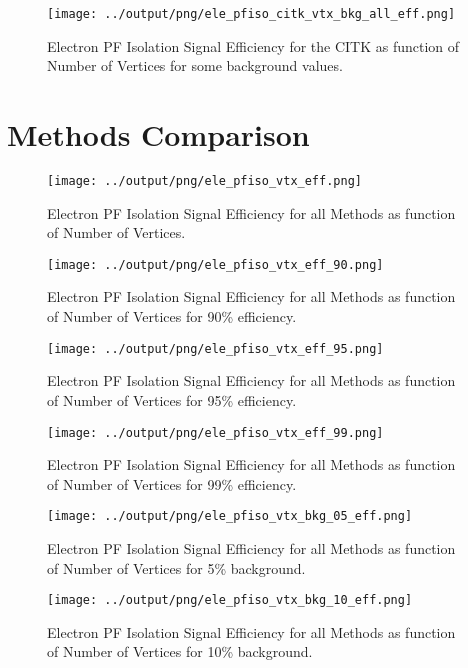\documentclass[11pt]{book}
\begin{document}
\begin{figure}[htb]
\centering
\texttt{[image: ../output/png/ele\_pfiso\_citk\_vtx\_bkg\_all\_eff.png]}
\caption{Electron PF Isolation Signal Efficiency for the CITK as function of Number of Vertices for some background values.}
\label{fig:ele_pfiso_vtx_eff_citk_bkg_all_eff}
\end{figure}
\clearpage

\section{Methods Comparison}
\begin{figure}[htb]
\centering
\texttt{[image: ../output/png/ele\_pfiso\_vtx\_eff.png]}
\caption{Electron PF Isolation Signal Efficiency for all Methods as function of Number of Vertices.}
\label{fig:ele_pfiso_vtx_eff}
\end{figure}

\begin{figure}[htb]
\centering
\texttt{[image: ../output/png/ele\_pfiso\_vtx\_eff\_90.png]}
\caption{Electron PF Isolation Signal Efficiency for all Methods as function of Number of Vertices for 90\% efficiency.}
\label{fig:ele_pfiso_vtx_eff_90}
\end{figure}

\begin{figure}[htb]
\centering
\texttt{[image: ../output/png/ele\_pfiso\_vtx\_eff\_95.png]}
\caption{Electron PF Isolation Signal Efficiency for all Methods as function of Number of Vertices for 95\% efficiency.}
\label{fig:ele_pfiso_vtx_eff_95}
\end{figure}

\begin{figure}[htb]
\centering
\texttt{[image: ../output/png/ele\_pfiso\_vtx\_eff\_99.png]}
\caption{Electron PF Isolation Signal Efficiency for all Methods as function of Number of Vertices for 99\% efficiency.}
\label{fig:ele_pfiso_vtx_eff_99}
\end{figure}

\begin{figure}[htb]
\centering
\texttt{[image: ../output/png/ele\_pfiso\_vtx\_bkg\_05\_eff.png]}
\caption{Electron PF Isolation Signal Efficiency for all Methods as function of Number of Vertices for 5\% background.}
\label{fig:ele_pfiso_vtx_bkg_05_eff}
\end{figure}

\begin{figure}[htb]
\centering
\texttt{[image: ../output/png/ele\_pfiso\_vtx\_bkg\_10\_eff.png]}
\caption{Electron PF Isolation Signal Efficiency for all Methods as function of Number of Vertices for 10\% background.}
\label{fig:ele_pfiso_vtx_bkg_10_eff}
\end{figure}
\end{document}
